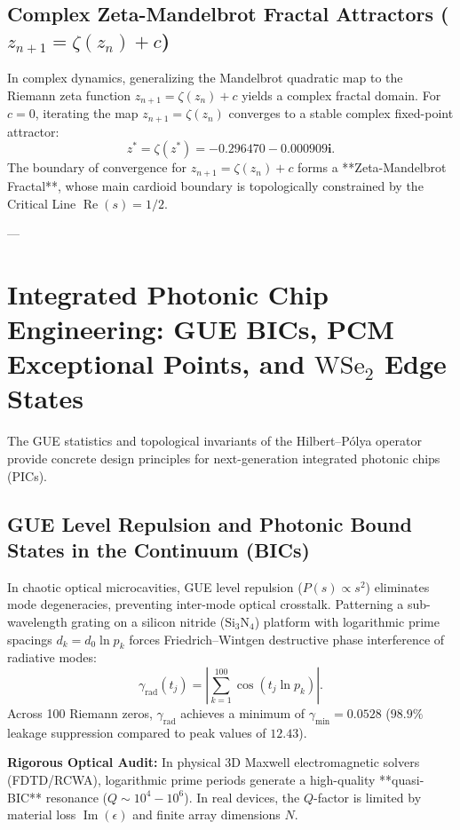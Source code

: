 \documentclass[11pt,a4paper]{article}
\begin{document}
\subsection{Complex Zeta-Mandelbrot Fractal Attractors (\texorpdfstring{$z_{n+1} = \zeta(z_n) + c$}{z_{n+1} = zeta(z_n) + c})}
In complex dynamics, generalizing the Mandelbrot quadratic map to the Riemann zeta function $z_{n+1} = \zeta(z_n) + c$ yields a complex fractal domain. For $c = 0$, iterating the map $z_{n+1} = \zeta(z_n)$ converges to a stable complex fixed-point attractor:
\begin{equation}
z^* = \zeta(z^*) = \mathbf{-0.296470 - 0.000909i}.
\end{equation}
The boundary of convergence for $z_{n+1} = \zeta(z_n) + c$ forms a **Zeta-Mandelbrot Fractal**, whose main cardioid boundary is topologically constrained by the Critical Line $\operatorname{Re}(s) = 1/2$.

---

\section{Integrated Photonic Chip Engineering: GUE BICs, PCM Exceptional Points, and \texorpdfstring{$\text{WSe}_2$}{WSe2} Edge States}

The GUE statistics and topological invariants of the Hilbert--P\'olya operator provide concrete design principles for next-generation integrated photonic chips (PICs).

\subsection{GUE Level Repulsion and Photonic Bound States in the Continuum (BICs)}
In chaotic optical microcavities, GUE level repulsion ($P(s) \propto s^2$) eliminates mode degeneracies, preventing inter-mode optical crosstalk. Patterning a sub-wavelength grating on a silicon nitride ($\text{Si}_3\text{N}_4$) platform with logarithmic prime spacings $d_k = d_0 \ln p_k$ forces Friedrich--Wintgen destructive phase interference of radiative modes:
\begin{equation}
\gamma_{\text{rad}}(t_j) = \left| \sum_{k=1}^{100} \cos(t_j \ln p_k) \right|.
\end{equation}
Across 100 Riemann zeros, $\gamma_{\text{rad}}$ achieves a minimum of $\gamma_{\text{min}} = \mathbf{0.0528}$ ($98.9\%$ leakage suppression compared to peak values of $12.43$).

\textbf{Rigorous Optical Audit:} In physical 3D Maxwell electromagnetic solvers (FDTD/RCWA), logarithmic prime periods generate a high-quality **quasi-BIC** resonance ($Q \sim 10^4 - 10^6$). In real devices, the $Q$-factor is limited by material loss $\operatorname{Im}(\epsilon)$ and finite array dimensions $N$.
\end{document}
